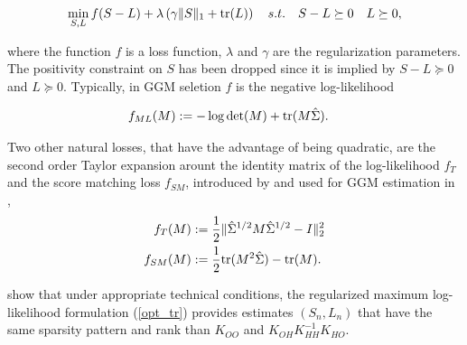 \begin{align}
\label{opt_tr}
\min_{S,L} f(S-L)+\lambda\left(\gamma\|S\|_{1}+ {\rm tr}(L)\right) \quad s.t. \quad S-L \succeq 0 \quad L \succeq 0,
\end{align}

where the function $f$ is a loss function, $\lambda$ and $\gamma$ are the regularization parameters. The positivity constraint on $S$ has been dropped since it is implied by $S-L \succeq 0$ and $L \succeq 0$. Typically, in GGM seletion $f$ is the negative log-likelihood

\begin{align}
f_{ML}(M)&:=-\log\det(M) + {\rm tr}(M\hat{\Sigma}).
\end{align}

 
Two other natural losses, that have the advantage of being quadratic, are the second order Taylor expansion arount the identity matrix of the log-likelihood $f_{T}$ and the score matching loss $f_{SM}$, introduced by \citet{hyvarinen2005estimation} and used for GGM estimation in \citet{lin2016estimation},
\begin{align}
f_{T}(M)&:=\frac{1}{2}\|\hat{\Sigma}^{1/2}M\hat{\Sigma}^{1/2}-I\|_2^2\\
f_{SM}(M)&:=\frac{1}{2}{\rm tr}(M^2 \hat{\Sigma})-{\rm tr}(M).
\end{align}

\citet{chandrasekaran2010} show that under appropriate technical conditions, the regularized maximum log-likelihood formulation (\ref{opt_tr}) provides estimates $(S_{n},L_{n})$ that have the same sparsity pattern and rank than $K_{OO}$ and $K_{OH}K_{HH}^{-1}K_{HO}$. 

%
%


